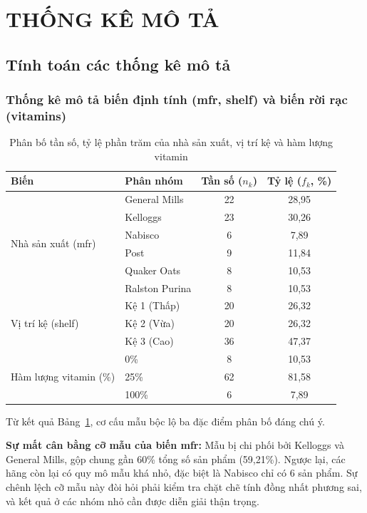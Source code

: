 \documentclass[12pt,a4paper]{article}
\begin{document}
\section{THỐNG KÊ MÔ TẢ}
\label{sec:mota}

\subsection{Tính toán các thống kê mô tả}

\subsubsection{Thống kê mô tả biến định tính (mfr, shelf) và biến rời rạc (vitamins)}

\begin{table}[H]
\centering
\caption{Phân bố tần số, tỷ lệ phần trăm của nhà sản xuất, vị trí kệ và hàm lượng vitamin}
\label{tab:tanso}
\begin{tabular}{l l c c}
\toprule
Biến & Phân nhóm & Tần số ($n_k$) & Tỷ lệ ($f_k$, \%) \\
\midrule
\multirow{6}{*}{Nhà sản xuất (mfr)}
  & General Mills  & 22 & 28,95 \\
  & Kelloggs       & 23 & 30,26 \\
  & Nabisco        & 6  & 7,89 \\
  & Post           & 9  & 11,84 \\
  & Quaker Oats    & 8  & 10,53 \\
  & Ralston Purina & 8  & 10,53 \\
\midrule
\multirow{3}{*}{Vị trí kệ (shelf)}
  & Kệ 1 (Thấp) & 20 & 26,32 \\
  & Kệ 2 (Vừa)  & 20 & 26,32 \\
  & Kệ 3 (Cao)  & 36 & 47,37 \\
\midrule
\multirow{3}{*}{Hàm lượng vitamin (\%)}
  & 0\%   & 8  & 10,53 \\
  & 25\%  & 62 & 81,58 \\
  & 100\% & 6  & 7,89 \\
\bottomrule
\end{tabular}
\end{table}

Từ kết quả Bảng~\ref{tab:tanso}, cơ cấu mẫu bộc lộ ba đặc điểm phân bố đáng chú ý.

\textbf{Sự mất cân bằng cỡ mẫu của biến mfr:} Mẫu bị chi phối bởi Kelloggs và General
Mills, gộp chung gần 60\% tổng số sản phẩm (59,21\%). Ngược lại, các hãng còn lại có quy mô
mẫu khá nhỏ, đặc biệt là Nabisco chỉ có 6 sản phẩm. Sự chênh lệch cỡ mẫu này đòi hỏi phải
kiểm tra chặt chẽ tính đồng nhất phương sai, và kết quả ở các nhóm nhỏ cần được diễn giải
thận trọng.
\end{document}
